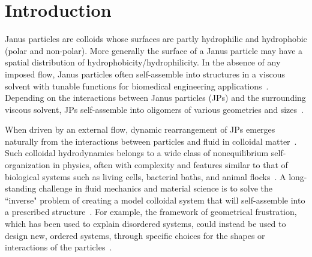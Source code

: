 \documentclass[prb,preprint,showpacs,preprintnumbers,amsmath,amssymb,longbibliography]{revtex4-1}
\begin{document}



\maketitle


\section{Introduction}
Janus particles are colloids whose surfaces 
are partly hydrophilic and hydrophobic (polar and non-polar).
More generally the surface of a Janus particle may have a spatial distribution of hydrophobicity/hydrophilicity.
In the absence of any imposed flow, Janus particles often self-assemble into
structures in a viscous solvent with tunable functions for biomedical engineering
applications~\cite{GheisariSahfieeAbbasiEtAl2021_DMR,
LiuYangHuangEtAl2016_Angew, LiWangYaoEtAl2019_Nanoscale, Bradley2016}.
Depending on the interactions between Janus particles (JPs) and the
surrounding viscous solvent, JPs self-assemble into oligomers of various
geometries and sizes~\cite{Bradley2017}. 


When driven by an external flow, 
dynamic rearrangement of JPs emerges naturally from the interactions between particles and fluid in colloidal
matter~\cite{Brandner2019,RevModPhys.93.025008}. Such colloidal hydrodynamics belongs to a wide class of
nonequilibrium self-organization in physics, often with complexity and features similar to that of 
biological systems such as living cells, bacterial baths, and
animal flocks~\cite{CollardGrosjeanVandewalle2020,Vutukuri2020}. A
long-standing challenge in fluid mechanics and material science is to
solve the ``inverse" problem of creating a model colloidal system that
will self-assemble into a prescribed
structure~\cite{PhysRevLett.128.256102}. For example, the framework of
geometrical frustration, which has been used to explain disordered
systems, could instead be used to design new, ordered systems, through
specific choices for the shapes or interactions of the
particles~\cite{Manoharan2015_Science}.
\end{document}
